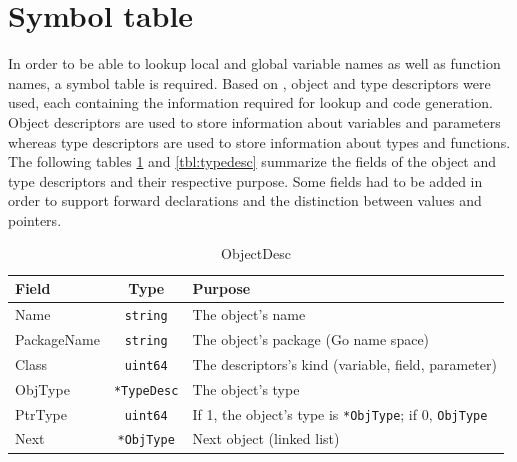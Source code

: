 \documentclass[a4paper]{scrartcl}
\let\chapter\section
\let\section\subsection
\let\subsection\subsubsection
\let\subsubsection\paragraph
\let\paragraph\subparagraph
\let\subparagraph\undefined
\begin{document}
  \chapter{Symbol table}
    In order to be able to lookup local and global variable names as well as function names, a symbol table is required. Based on \cite{wir96}, object and type descriptors were used, each containing the information required for lookup and code generation. Object descriptors are used to store information about variables and parameters whereas type descriptors are used to store information about types and functions.\\
    The following tables \ref{tbl:objectdesc} and \ref{tbl:typedesc} summarize the fields of the object and type descriptors and their respective purpose. Some fields had to be added in order to support forward declarations and the distinction between values and pointers.
      \begin{table}[htb]
      \centering
      \begin{tabular}{lcl}
        \toprule
        \textbf{Field} & \textbf{Type} & \textbf{Purpose}\\ 
        \midrule
        Name & \texttt{string} & The object's name\\
        PackageName & \texttt{string} & The object's package (Go name space)\\
        Class & \texttt{uint64} & The descriptors's kind (variable, field, parameter)\\
        ObjType & \texttt{*TypeDesc} & The object's type\\
        PtrType & \texttt{uint64} & If 1, the object's type is \texttt{*ObjType}; if 0, \texttt{ObjType}\\
        Next & \texttt{*ObjType} & Next object (linked list)\\
        \bottomrule
      \end{tabular}
      \caption{ObjectDesc}
      \label{tbl:objectdesc}
      \end{table}
\end{document}
